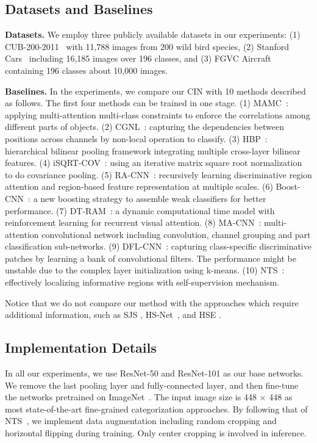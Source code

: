 \documentclass[letterpaper]{article} \usepackage{aaai20}  \usepackage{times}  \usepackage{helvet} \usepackage{courier}  \usepackage[hyphens]{url}  \usepackage{graphicx} \urlstyle{rm} \def\UrlFont{\rm}  \usepackage{graphicx}  \frenchspacing  \setlength{\pdfpagewidth}{8.5in}  \setlength{\pdfpageheight}{11in}  \usepackage{amsmath,amssymb}
\begin{document}
\subsection{Datasets and Baselines}
\label{sec:data-basline}

\noindent\textbf{Datasets.} We employ three publicly available datasets in our experiments:
(1) CUB-200-2011~\cite{wah2011caltech} with 11,788 images from 200 wild bird species,
(2) Stanford Cars~\cite{krause20133d} including 16,185 images over 196 classes,
and
(3) FGVC Aircraft~\cite{DBLP:journals/corr/MajiRKBV13} containing 196 classes about 10,000 images.

\noindent\textbf{Baselines.}
In the experiments, we compare our CIN with 10 methods described as follows.
The first four methods can be trained in one stage.
(1) MAMC~\cite{DBLP:conf/eccv/SunYZD18}: applying multi-attention multi-class constraints to enforce the correlations among different parts of objects.
(2) CGNL~\cite{yue2018compact}: capturing the dependencies between positions across channels by non-local operation to classify.
(3) HBP~\cite{yu2018hierarchical}: hierarchical bilinear pooling framework integrating multiple cross-layer bilinear features.
(4) iSQRT-COV~\cite{yu2018hierarchical}: using an iterative matrix square root normalization to do covariance pooling.
(5) RA-CNN~\cite{fu2017look}: recursively learning discriminative region attention and region-based feature representation at multiple scales.
(6) Boost-CNN~\cite{DBLP:conf/bmvc/MoghimiBSYVL16}: a new boosting strategy to assemble weak classifiers for better performance.
(7) DT-RAM~\cite{li2017dynamic}: a dynamic computational time model with reinforcement learning for recurrent visual attention.
(8) MA-CNN~\cite{zheng2017learning}: multi-attention convolutional network including convolution, channel grouping and part classification sub-networks.
(9) DFL-CNN~\cite{wang2018learning}: capturing class-specific discriminative patches by learning a bank of convolutional filters. The performance might be unstable due to the complex layer initialization using k-means.
(10) NTS~\cite{yang2018learning}: effectively localizing informative regions with self-supervision mechanism.

Notice that we do not compare our method  with the approaches which require additional information, such as SJS \cite{ge2017borrowing}, HS-Net~\cite{lam2017fine}, and  HSE \cite{chen2018fine}.


\subsection{Implementation Details}
In all our experiments, we use ResNet-50 and ResNet-101 as our base networks. We remove the last pooling layer and fully-connected layer, and then fine-tune the networks pretrained on ImageNet~\cite{DBLP:journals/ijcv/RussakovskyDSKS15}. The input image size is 448 $\times$ 448 as most state-of-the-art fine-grained categorization approaches. By following that of NTS~\cite{yang2018learning}, we implement data augmentation including random cropping
and horizontal flipping during training. Only center cropping is involved in inference.
\end{document}
